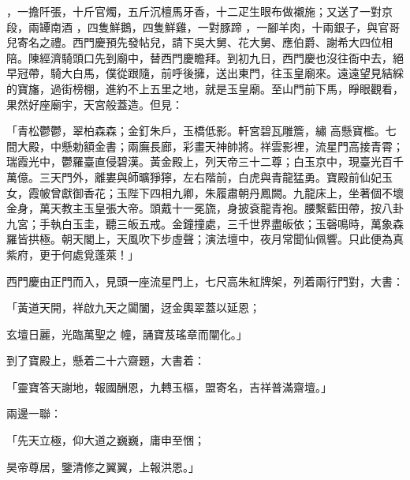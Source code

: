 \begin{showcontents}{}
，一擔阡張，十斤官燭，五斤沉檀馬牙香，十二疋生眼布做襯施；又送了一對京段，兩罈南酒 ，四隻鮮鵝，四隻鮮雞，一對豚蹄 ，一腳羊肉，十兩銀子，與官哥兒寄名之禮。西門慶預先發帖兒，請下吳大舅、花大舅、應伯爵、謝希大四位相陪。陳經濟騎頭口先到廟中，替西門慶瞻拜。到初九日，西門慶也沒往衙中去，絕早冠帶，騎大白馬，僕從跟隨，前呼後擁，送出東門，往玉皇廟來。遠遠望見結綵的寶旛，過街榜棚，進約不上五里之地，就是玉皇廟。至山門前下馬，睜眼觀看，果然好座廟宇，天宮般蓋造。但見：

「青松鬱鬱，翠柏森森；金釘朱戶，玉橋低影。軒宮碧瓦雕簷，繡 高懸寶檻。七間大殿，中懸勅額金書；兩廡長廊，彩畫天神帥將。祥雲影裡，流星門高接青霄；瑞霞光中，鬱羅臺直侵碧漢。黃金殿上，列天帝三十二尊；白玉京中，現臺光百千萬億。三天門外，離婁與師曠猙獰，左右階前，白虎與青龍猛勇。寶殿前仙妃玉女，霞帔曾獻御香花；玉陛下四相九卿，朱履肅朝丹鳳闕。九龍床上，坐著個不壞金身，萬天教主玉皇張大帝。頭戴十一冕旒，身披袞龍青袍。腰繫藍田帶，按八卦九宮；手執白玉圭，聽三皈五戒。金鐘撞處，三千世界盡皈依；玉磬鳴時，萬象森羅皆拱極。朝天閣上，天風吹下步虛聲；演法壇中，夜月常聞仙佩響。只此便為真紫府，更于何處覓蓬萊！」

西門慶由正門而入，見頭一座流星門上，七尺高朱紅牌架，列着兩行門對，大書：

「黃道天開，祥啟九天之闐闔，迓金輿翠蓋以延恩；

玄壇日麗，光臨萬聖之 幢，誦寶芨瑤章而闡化。」

到了寶殿上，懸着二十六齋題，大書着：

「靈寶答天謝地，報國酬恩，九轉玉樞，盟寄名，吉祥普滿齋壇。」

兩邊一聯：

「先天立極，仰大道之巍巍，庸申至悃；

昊帝尊居，鑒清修之翼翼，上報洪恩。」


\end{showcontents}
